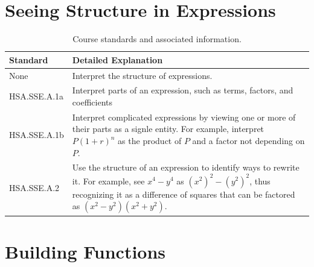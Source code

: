 \documentclass[12pt, oneside]{book}
\begin{document}
\chapter{Seeing Structure in Expressions}

\begin{table}[h]
    \centering
    \caption{Course standards and associated information.}
    \vspace{0.3cm} %
    \begin{tabularx}{\textwidth}{l X} %
        \toprule
        \textbf{Standard} & \textbf{Detailed Explanation} \\
        \midrule
        None & Interpret the structure of expressions. \\
        HSA.SSE.A.1a & Interpret parts of an expression, such as terms, factors, and coefficients \\
        HSA.SSE.A.1b & Interpret complicated expressions by viewing one or more of their parts as a signle entity. For example, interpret $P(1+r)^n$ as the product of $P$ and a factor not depending on $P$. \\
        HSA.SSE.A.2 & Use the structure of an expression to identify ways to rewrite it. For example, see $x^4-y^4$ as $(x^2)^2 - (y^2)^2$, thus recognizing it as a difference of squares that can be factored as $(x^2-y^2)(x^2+y^2)$. \\
        \bottomrule
    \end{tabularx}
\end{table}

\chapter{Building Functions}
\end{document}
